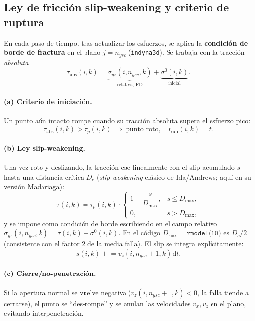 \documentclass[11pt,a4paper]{article}
\newcommand{\dd}{\mathrm{d}}
\begin{document}
\subsection{Ley de fricción slip-weakening y criterio de ruptura}
En cada paso de tiempo, tras actualizar los esfuerzos, se aplica la
\textbf{condición de borde de fractura} en el plano $j=n_{ysc}$
(\texttt{indyna3d}). Se trabaja con la tracción \emph{absoluta}
\begin{equation}
  \tau_{\text{abs}}(i,k) = \underbrace{\sigma_{yz}(i,n_{ysc},k)}_{\text{relativa, FD}}
                          + \underbrace{\sigma^0(i,k)}_{\text{inicial}} .
\end{equation}

\paragraph{(a) Criterio de iniciación.} Un punto aún intacto rompe cuando su
tracción absoluta supera el esfuerzo pico:
\begin{equation}
  \tau_{\text{abs}}(i,k) > \tau_p(i,k)
  \;\Longrightarrow\; \text{punto roto},\quad
  t_{\text{rup}}(i,k)=t .
\end{equation}

\paragraph{(b) Ley slip-weakening.} Una vez roto y deslizando, la tracción cae
linealmente con el slip acumulado $s$ hasta una distancia crítica $D_c$
(\emph{slip-weakening} clásico de Ida/Andrews; aquí en su versión Madariaga):
\begin{equation}
  \tau(i,k) = \tau_p(i,k)\cdot
  \begin{cases}
    1 - \dfrac{s}{D_{\max}}, & s \le D_{\max},\\[8pt]
    0, & s > D_{\max},
  \end{cases}
  \label{eq:sw}
\end{equation}
y se impone como condición de borde escribiendo en el campo relativo
$\sigma_{yz}(i,n_{ysc},k) = \tau(i,k) - \sigma^0(i,k)$. En el código
$D_{\max}=\texttt{rmodel(10)}$ es \textbf{$D_c/2$} (consistente con el factor 2 de
la media falla). El slip se integra explícitamente:
\begin{equation}
  s(i,k)\mathrel{+}= v_z(i,n_{ysc}{+}1,k)\,\dd t .
\end{equation}

\paragraph{(c) Cierre/no-penetración.} Si la apertura normal se vuelve negativa
($v_z(i,n_{ysc}{+}1,k)<0$, la falla tiende a cerrarse), el punto se ``des-rompe''
y se anulan las velocidades $v_x,v_z$ en el plano, evitando interpenetración.
\end{document}
